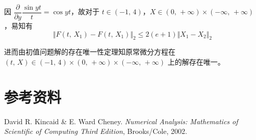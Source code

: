 \documentclass{ctexart}
\begin{document}
	因 $\displaystyle\dfrac{\partial}{\partial y}\dfrac{\sin yt}{t} = \cos yt$，故对于 $t \in (-1,\,4)$，$X \in (0,\,+\infty) \times (-\infty,\,+\infty)$，易知有
	\begin{equation}
		\Big\Vert F(t,\,X_1) - F(t,\,X_1)\Big\Vert_2 \leqslant 2(e+1)\Big\Vert X_1 - X_2\Big\Vert_2
	\end{equation}
	
	进而由初值问题解的存在唯一性定理知原常微分方程在 $(t,\,X) \in (-1,\,4) \times (0,\,+\infty) \times (-\infty,\,+\infty)$ 上的解存在唯一。
	

\section*{参考资料}
	\noindent [1] David R. Kincaid \& E. Ward Cheney. {\it Numerical Analysis: Mathematics of Scientific of Computing Third Edition}, Brooks/Cole, 2002.
\end{document}
